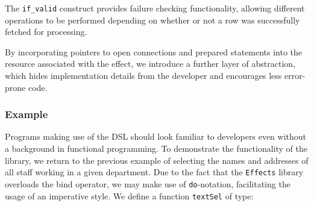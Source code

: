 \noindent
The \texttt{if\_valid} construct provides failure checking functionality, allowing different operations to be performed depending on whether or not a row was successfully fetched for processing.





By incorporating pointers to open connections and prepared statements into the
resource associated with the effect, we introduce a further layer of
abstraction, which hides implementation details from the developer and
encourages less error-prone code. 

\subsubsection{Example}

Programs making use of the DSL should look familiar to developers even without
a background in functional programming. To demonstrate the functionality of the
library, we return to the previous example of selecting the names and addresses
of all staff working in a given department. Due to the fact that the
\texttt{Effects} library overloads the bind operator, we may make use of
\texttt{do}-notation, facilitating the usage of an imperative style.
We define a function \texttt{textSel} of type:

